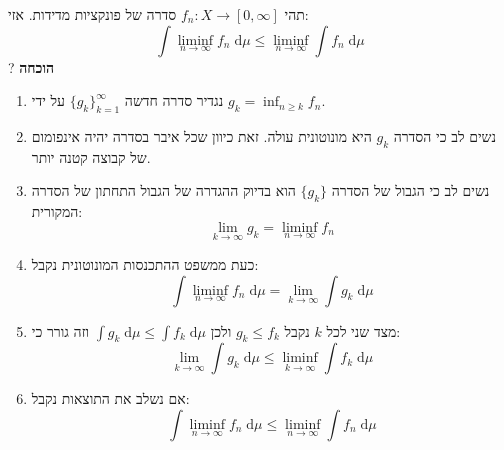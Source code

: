 \documentclass{tstextbook}
\begin{document}
\begin{theorem}
תהי \(f_{n}:X\to \left[ 0,\infty \right]\) סדרה של פונקציות מדידות. אזי:
$$\int \liminf_{ n \to \infty }  f_{n}\;\mathrm{d} \mu \leq \liminf_{ n \to \infty } \int f_{n} \;\mathrm{d} \mu   $$
?
\textbf{הוכחה}

  \begin{enumerate}
    \item נגדיר סדרה חדשה \(\{ g_{k} \}_{k=1}^{\infty}\) על ידי \(g_{k}=\inf_{n\geq k}f_{n}\). 


    \item נשים לב כי הסדרה \(g_{k}\) היא מונוטונית עולה. זאת כיוון שכל איבר בסדרה יהיה אינפומום של קבוצה קטנה יותר. 


    \item נשים לב כי הגבול של הסדרה \(\{ g_{k} \}\) הוא בדיוק ההגדרה של הגבול התחתון של הסדרה המקורית: 
$$\lim_{ k \to \infty } g_{k}=\liminf_{ n \to \infty } f_{n} $$


    \item כעת ממשפט ההתכנסות המונוטונית נקבל: 
$$\int \liminf_{ n \to \infty } f_{n} \;\mathrm{d} \mu = \lim_{ k \to \infty } \int g_{k} \;\mathrm{d} \mu  $$


    \item מצד שני לכל \(k\) נקבל \(g_{k}\leq f_{k}\) ולכן \(\int g_{k} \;\mathrm{d} \mu \leq \int f_{k} \;\mathrm{d} \mu\) וזה גורר כי: 
$$\lim_{ k \to \infty } \int g_{k} \;\mathrm{d} \mu \leq \liminf_{ k \to \infty }   \int f_{k} \;\mathrm{d} \mu $$


    \item אם נשלב את התוצאות נקבל: 
$$\int \liminf_{ n \to \infty }  f_{n}\;\mathrm{d} \mu \leq \liminf_{ n \to \infty } \int f_{n} \;\mathrm{d} \mu   $$


  \end{enumerate}
\end{theorem}
\end{document}

